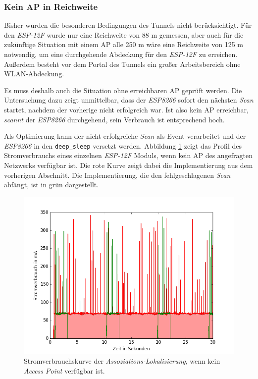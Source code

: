 \subsubsection{Kein AP in Reichweite}
Bisher wurden die besonderen Bedingungen des Tunnels nicht berücksichtigt.
Für den \emph{ESP-12F} wurde nur eine Reichweite von 88 m gemessen, aber auch für die zukünftige Situation mit einem AP alle 250 m wäre eine Reichweite von 125 m notwendig, um eine durchgehende Abdeckung für den \emph{ESP-12F} zu erreichen.
Außerdem besteht vor dem Portal des Tunnels ein großer Arbeitsbereich ohne WLAN-Abdeckung.

Es muss deshalb auch die Situation ohne erreichbaren AP geprüft werden.
Die Untersuchung dazu zeigt unmittelbar, dass der \emph{ESP8266} sofort den nächsten \emph{Scan} startet, nachdem der vorherige nicht erfolgreich war.
Ist also kein AP erreichbar, \emph{scannt} der \emph{ESP8266} durchgehend, sein Verbrauch ist entsprechend hoch.

Als Optimierung kann der nicht erfolgreiche \emph{Scan} als Event verarbeitet und der \emph{ESP8266} in den \texttt{deep\_sleep} versetzt werden.
Abbildung \ref{fig:noap} zeigt das Profil des Stromverbrauchs eines einzelnen \emph{ESP-12F} Moduls, wenn kein AP des angefragten Netzwerks verfügbar ist.
Die rote Kurve zeigt dabei die Implementierung aus dem vorherigen Abschnitt. 
Die Implementierung, die den fehlgeschlagenen \emph{Scan} abfängt, ist in grün dargestellt.

\begin{figure}[h!]
  \centering
	\includegraphics[width=\textwidth]{plots/noap.png}
  \caption{Stromverbrauchskurve der \emph{Assoziations-Lokalisierung}, wenn kein \emph{Access Point} verfügbar ist.}
  \label{fig:noap}
\end{figure}

